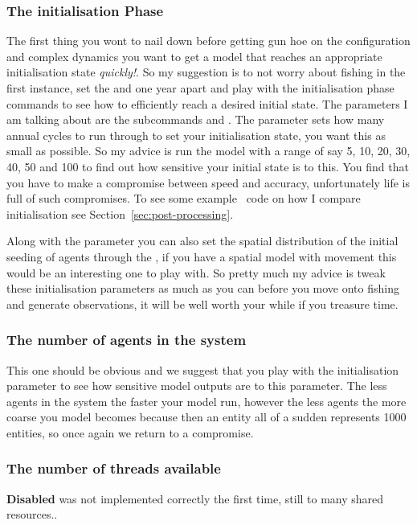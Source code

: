 \subsubsection*{The initialisation Phase}
The first thing you wont to nail down before getting gun hoe on the configuration and complex dynamics you want to get a model that reaches an appropriate initialisation state \emph{quickly!}. So my suggestion is to not worry about fishing in the first instance, set the  and  one year apart and play with the initialisation phase commands to see how to efficiently reach a desired initial state. The parameters I am talking about are the subcommands  and . The  parameter sets how many annual cycles to run through to set your initialisation state, you want this as small as possible. So my advice is run the model with a range of  say 5, 10, 20, 30, 40, 50 and 100 to find out how sensitive your initial state is to this. You find that you have to make a compromise between speed and accuracy, unfortunately life is full of such compromises. To see some example \R\ code on how I compare initialisation see Section~\ref{sec:post-processing}.

Along with the  parameter you can also set the spatial distribution of the initial seeding of agents through the , if you have a spatial model with movement this would be an interesting one to play with. So pretty much my advice is tweak these initialisation parameters as much as you can before you move onto fishing and generate observations, it will be well worth your while if you treasure time.

\subsubsection*{The number of agents in the system} 
This one should be obvious and we suggest that you play with the initialisation parameter  to see how sensitive model outputs are to this parameter. The less agents in the system the faster your model run, however the less agents the more coarse you model becomes because then an entity all of a sudden represents 1000 entities, so once again we return to a compromise.

\subsubsection*{The number of threads available}
\textbf{Disabled} was not implemented correctly the first time, still to many shared resources.. 

